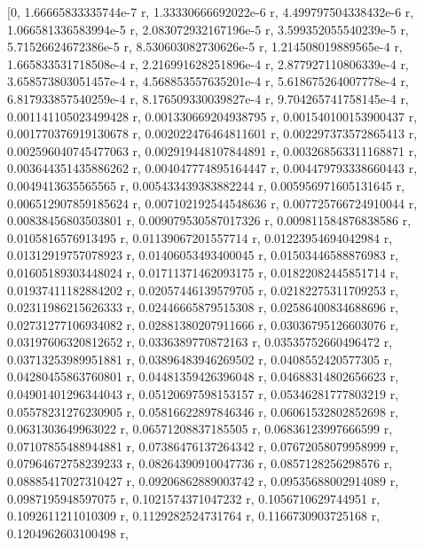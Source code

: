 \documentclass[12pt,Times new roman,letterpaper]{book}
\begin{document}
\begin{eulernootebook}
\begin{eulercomment}
\begin{eulercomment}
\begin{eulernootebook}
\begin{eulercomment}
\begin{eulercomment}
\begin{eulercomment}
\begin{eulercomment}
\begin{eulercomment}
\begin{eulercomment}
\begin{eulernotebook}
\begin{eulercomment}
\begin{eulercomment}
\begin{eulercomment}
\begin{eulercomment}
\begin{eulercomment}
\begin{eulercomment}
\begin{eulercomment}
\begin{eulercomment}
\begin{eulercomment}
\begin{eulercomment}
\begin{eulercomment}
\begin{eulercomment}
\begin{eulercomment}
\begin{eulercomment}
\begin{eulercomment}
\begin{eulercomment}
\begin{euleroutput}
          [0, 1.66665833335744e-7 r, 1.33330666692022e-6 r, 
  4.499797504338432e-6 r, 1.066581336583994e-5 r, 
  2.083072932167196e-5 r, 3.599352055540239e-5 r, 
  5.71526624672386e-5 r, 8.530603082730626e-5 r, 
  1.214508019889565e-4 r, 1.665833531718508e-4 r, 
  2.216991628251896e-4 r, 2.877927110806339e-4 r, 
  3.658573803051457e-4 r, 4.568853557635201e-4 r, 
  5.618675264007778e-4 r, 6.817933857540259e-4 r, 
  8.176509330039827e-4 r, 9.704265741758145e-4 r, 
  0.001141105023499428 r, 0.001330669204938795 r, 
  0.001540100153900437 r, 0.001770376919130678 r, 
  0.002022476464811601 r, 0.002297373572865413 r, 
  0.002596040745477063 r, 0.002919448107844891 r, 
  0.003268563311168871 r, 0.003644351435886262 r, 
  0.004047774895164447 r, 0.004479793338660443 r, 0.0049413635565565 r, 
  0.005433439383882244 r, 0.005956971605131645 r, 
  0.006512907859185624 r, 0.007102192544548636 r, 
  0.007725766724910044 r, 0.00838456803503801 r, 
  0.009079530587017326 r, 0.009811584876838586 r, 0.0105816576913495 r, 
  0.01139067201557714 r, 0.01223954694042984 r, 0.01312919757078923 r, 
  0.01406053493400045 r, 0.01503446588876983 r, 0.01605189303448024 r, 
  0.01711371462093175 r, 0.01822082445851714 r, 0.01937411182884202 r, 
  0.02057446139579705 r, 0.02182275311709253 r, 0.02311986215626333 r, 
  0.02446665879515308 r, 0.02586400834688696 r, 0.02731277106934082 r, 
  0.02881380207911666 r, 0.03036795126603076 r, 0.03197606320812652 r, 
  0.0336389770872163 r, 0.03535752660496472 r, 0.03713253989951881 r, 
  0.03896483946269502 r, 0.0408552420577305 r, 0.04280455863760801 r, 
  0.04481359426396048 r, 0.04688314802656623 r, 0.04901401296344043 r, 
  0.05120697598153157 r, 0.05346281777803219 r, 0.05578231276230905 r, 
  0.05816622897846346 r, 0.06061532802852698 r, 0.0631303649963022 r, 
  0.06571208837185505 r, 0.06836123997666599 r, 0.07107855488944881 r, 
  0.07386476137264342 r, 0.07672058079958999 r, 0.07964672758239233 r, 
  0.08264390910047736 r, 0.0857128256298576 r, 0.08885417027310427 r, 
  0.09206862889003742 r, 0.09535688002914089 r, 0.0987195948597075 r, 
  0.1021574371047232 r, 0.1056710629744951 r, 0.1092611211010309 r, 
  0.1129282524731764 r, 0.1166730903725168 r, 0.1204962603100498 r, 

\end{euleroutput}
\end{eulercomment}
\end{eulercomment}
\end{eulercomment}
\end{eulercomment}
\end{eulercomment}
\end{eulercomment}
\end{eulercomment}
\end{eulercomment}
\end{eulercomment}
\end{eulercomment}
\end{eulercomment}
\end{eulercomment}
\end{eulercomment}
\end{eulercomment}
\end{eulercomment}
\end{eulercomment}
\end{eulernotebook}
\end{eulercomment}
\end{eulercomment}
\end{eulercomment}
\end{eulercomment}
\end{eulercomment}
\end{eulercomment}
\end{eulernootebook}
\end{eulercomment}
\end{eulercomment}
\end{eulernootebook}
\end{document}
